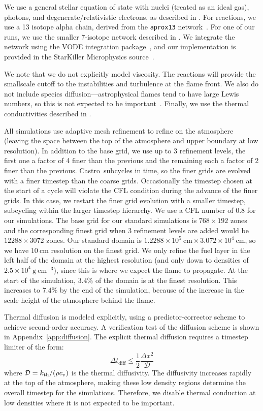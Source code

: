 \documentclass[preprint,times,tighten]{aastex63}
\newcommand{\kth}{k_{\rm th}}
\newcommand{\castro}{{\sf Castro}}
\newcommand{\gcc}{\mathrm{g~cm^{-3} }}
\newcommand{\MarginPar}[1]{
    \marginpar{\vskip-\baselineskip%
               \raggedright%
               \tiny\sffamily%
               {\color{red}\hrule%
               \smallskip%
               #1\par%
               \smallskip%
               \hrule}}%
}
\begin{document}
We use a general stellar equation of state with nuclei (treated as an
ideal gas), photons, and degenerate/relativistic electrons, as
described in \cite{timmes_swesty:2000}.  For reactions, we use a 13
isotope alpha chain, derived from the {\tt aprox13}
network~\citep{timmes_aprox13}.  For one of our runs, we use the
smaller 7-isotope network described in \citet{iso7}.  We integrate the
network using the VODE integration package~\citep{vode}, and our
implementation is provided in the StarKiller Microphysics
source~\citep{starkiller}.

We note that we do not explicitly model viscosity.  The reactions will
provide the smallscale cutoff to the instabilities and turbulence at
the flame front.  We also do not include species
diffusion---astrophysical flames tend to have large Lewis numbers, so
this is not expected to be important~\citep{timmeswoosley:1992}.
Finally, we use the thermal conductivities described in
\citet{Timmes00}.


All simulations use adaptive mesh refinement to refine on the
atmosphere (leaving the space between the top of the atmosphere and
upper boundary at low resolution).  In addition to the base grid, we
use up to 3 refinement levels, the first one a factor of 4 finer than
the previous and the remaining each a factor of 2 finer than the
previous.  \castro\ subcycles in time, so the finer grids are evolved
with a finer timestep than the coarse grids.  Occasionally the
timestep chosen at the start of a cycle will violate the CFL condition
during the advance of the finer grids.  In this case, we restart the
finer grid evolution with a smaller timestep, subcycling within the
larger timestep hierarchy.  We use a CFL number of 0.8 for our
simulations.  
The base grid for our standard
simulations is $768\times 192$ zones and the corresponding finest grid
when 3 refinement levels are added would be $12288\times 3072$ zones.
Our standard domain is $1.2288\times 10^5~\mathrm{cm} \times
3.072\times 10^4~\mathrm{cm}$, so we have $10~\mathrm{cm}$ resolution
on the finest grid.  We only refine the fuel layer in the left half of
the domain at the highest resolution (and only down to densities of
$2.5\times 10^4~\gcc$), since this is where we expect the flame to
propagate.  At the start of the simulation, $3.4\%$ of the domain is
at the finest resolution.  This increases to $7.4\%$ by the end of the
simulation, because of the increase in the scale height of the atmosphere
behind the flame.

Thermal diffusion is modeled explicitly, using a predictor-corrector
scheme to achieve second-order accuracy.  A verification test of the
diffusion scheme is shown in Appendix~\ref{app:diffusion}.  The
explicit thermal diffusion requires a timestep limiter of the form:
\begin{equation}
\Delta t_\mathrm{diff} \le \frac{1}{2} \frac{\Delta x^2}{\mathcal{D}}
\end{equation}
where $\mathcal{D} = \kth/(\rho c_v)$ is the thermal diffusivity.  The
diffusivity increases rapidly at the top of the atmosphere, making
these low density regions determine the overall timestep for the
simulations.  Therefore, we disable thermal conduction at low
densities where it is not expected to be important.
\end{document}
